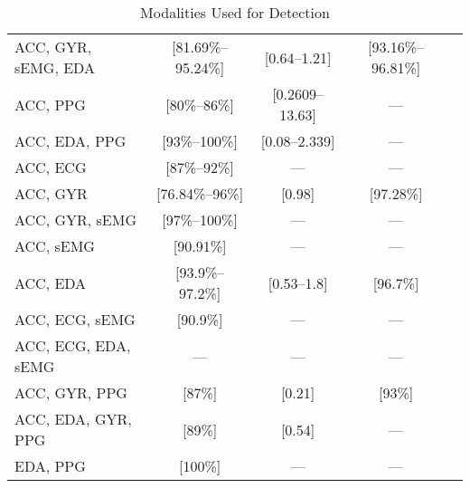 
\begin{table}
    \caption{Modalities Used for Detection}
    \vspace{1em}
    \label{tab:modalities}
    \footnotesize
\begin{tabularx}{\textwidth}{@{}lCCCC@{}}
\toprule
{} &  &  &  &  \\
\midrule
ACC, GYR, sEMG, EDA & [81.69\%--95.24\%] & [0.64--1.21] & [93.16\%--96.81\%] & \cite{Wang2025-ql, Ge2023-ab, Li2022-ty, Wu2024-yl, Wang2022-lt} \\
ACC, PPG & [80\%--86\%] & [0.2609--13.63] & --- & \cite{Ali2020-ke, Tang2021-td, Arends2018-ew, Yu2023-ss} \\
ACC, EDA, PPG & [93\%--100\%] & [0.08--2.339] & --- & \cite{Xu2022-tx, Nasseri2021-xn} \\
ACC, ECG & [87\%--92\%] & --- & --- & \cite{Van_Andel2017-yx, Hegarty-Craver2021-hk} \\
ACC, GYR & [76.84\%--96\%] & [0.98] & [97.28\%] & \cite{Larsen2024-vn, Dong2022-oo} \\
ACC, GYR, sEMG & [97\%--100\%] & --- & --- & \cite{Wang2025-my, Gheryani2017-yg} \\
ACC, sEMG & [90.91\%] & --- & --- & \cite{Milosevic2016-ee} \\
ACC, EDA & [93.9\%--97.2\%] & [0.53--1.8] & [96.7\%] & \cite{Regalia2019-ch, Poh2012-af, Chowdhury2022-bi} \\
ACC, ECG, sEMG & [90.9\%] & --- & --- & \cite{De_Cooman2018-pq} \\
ACC, ECG, EDA, sEMG & --- & --- & --- & \cite{Hamlin2021-sd} \\
ACC, GYR, PPG & [87\%] & [0.21] & [93\%] & \cite{Vakilna2024-hk} \\
ACC, EDA, GYR, PPG & [89\%] & [0.54] & --- & \cite{Jiang2022-zu} \\
EDA, PPG & [100\%] & --- & --- & \cite{Cogan2017-lg} \\
\bottomrule
\end{tabularx}

\end{table}